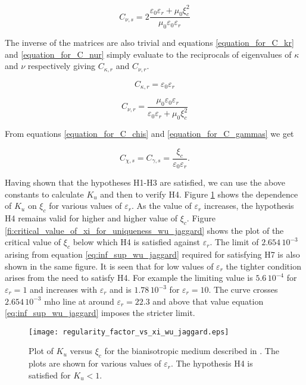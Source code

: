 \begin{equation}
C_{\nu,s} = 2\frac{\varepsilon_0\varepsilon_r+\mu_0\xi_c^2}{\mu_0\varepsilon_0\varepsilon_r}
\end{equation}

The inverse of the matrices are also trivial and equations \eqref{equation_for_C_kr} and \eqref{equation_for_C_nur} simply
evaluate to the reciprocals of eigenvalues of $\kappa$ and $\nu$ respectively giving $C_{\kappa,r}$ and $C_{\nu,r}$. 

\begin{equation}
C_{\kappa,r} = \varepsilon_0\varepsilon_r
\end{equation}

\begin{equation}
C_{\nu,r} = \frac{\mu_0\varepsilon_0\varepsilon_r}{\varepsilon_0\varepsilon_r+\mu_0\xi_c^2}
\end{equation}

From equations \eqref{equation_for_C_chis} and \eqref{equation_for_C_gammas} we get

\begin{equation}
C_{\chi,s} = C_{\gamma,s} = \frac{\xi_c}{\varepsilon_0\varepsilon_r}.
\end{equation}

Having shown that the hypotheses H1-H3 are satisfied, we can use the above 
constants to calculate $K_u$ and then to verify H4.
Figure \ref{fi:wu_jaggard_regularity_factor_vs_xi} shows the dependence of 
$K_u$ on $\xi_c$ for various values of $\varepsilon_r$.
As the value of $\varepsilon_r$ increases, the hypothesis H4 remains valid
for higher and higher value of $\xi_c$.
Figure \ref{fi:critical_value_of_xi_for_uniqueness_wu_jaggard} shows the
plot of the critical value of $\xi_c$ below which H4 is satisfied against 
$\varepsilon_r$.
The limit of $2.654 \, 10^{-3}$ arising from equation \eqref{eq:inf_sup_wu_jaggard}
required for satisfying H7 is also shown in the same figure.
It is seen that for low values of $\varepsilon_r$ the tighter condition arises from
the need to satisfy H4.
For example the limiting value is $5.6 \, 10^{-4}$ for $\varepsilon_r=1$ and increases
with $\varepsilon_r$ and is $1.78 \, 10^{-3}$ for $\varepsilon_r = 10$.
The curve crosses  $2.654 \, 10^{-3}$ mho line at around $\varepsilon_r = 22.3$ and 
above that value equation \eqref{eq:inf_sup_wu_jaggard} imposes the stricter limit. 

\begin{figure}
\texttt{[image: regularity\_factor\_vs\_xi\_wu\_jaggard.eps]}
\caption{Plot of $K_u$ versus $\xi_c$ for the bianisotropic medium described in \cite{wujaggard}.
The plots are shown for various values of $\varepsilon_r$. 
The hypothesis H4 is satisfied for $K_u < 1$.}
\label{fi:wu_jaggard_regularity_factor_vs_xi}
\end{figure}

